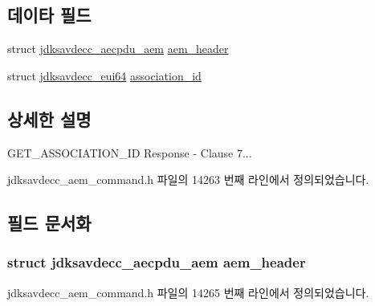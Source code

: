 \subsection*{데이타 필드}
\begin{DoxyCompactItemize}
\item 
struct \hyperlink{structjdksavdecc__aecpdu__aem}{jdksavdecc\+\_\+aecpdu\+\_\+aem} \hyperlink{structjdksavdecc__aem__command__get__association__id__response_ae1e77ccb75ff5021ad923221eab38294}{aem\+\_\+header}
\item 
struct \hyperlink{structjdksavdecc__eui64}{jdksavdecc\+\_\+eui64} \hyperlink{structjdksavdecc__aem__command__get__association__id__response_a0fa49c5118429af7a5ee7d71eada7b94}{association\+\_\+id}
\end{DoxyCompactItemize}


\subsection{상세한 설명}
G\+E\+T\+\_\+\+A\+S\+S\+O\+C\+I\+A\+T\+I\+O\+N\+\_\+\+ID Response -\/ Clause 7... 

jdksavdecc\+\_\+aem\+\_\+command.\+h 파일의 14263 번째 라인에서 정의되었습니다.



\subsection{필드 문서화}
\subsubsection[{\texorpdfstring{aem\+\_\+header}{aem_header}}]{\setlength{\rightskip}{0pt plus 5cm}struct {\bf jdksavdecc\+\_\+aecpdu\+\_\+aem} aem\+\_\+header}\hypertarget{structjdksavdecc__aem__command__get__association__id__response_ae1e77ccb75ff5021ad923221eab38294}{}\label{structjdksavdecc__aem__command__get__association__id__response_ae1e77ccb75ff5021ad923221eab38294}


jdksavdecc\+\_\+aem\+\_\+command.\+h 파일의 14265 번째 라인에서 정의되었습니다.

